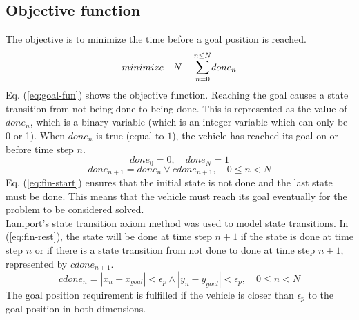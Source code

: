 \subsection{Objective function}
The objective is to minimize the time before a goal position is reached.
\begin{equation}
\label{eq:goal-fun}
minimize \quad N - \mathlarger{\sum}_{n=0}^{n \leq N} done_n
\end{equation}
Eq. (\ref{eq:goal-fun}) shows the objective function. Reaching the goal causes a state transition from not being done to being done. This is represented as the value of $done_n$, which is a binary variable (which is an integer variable which can only be 0 or 1). When $done_n$ is true (equal to $1$), the vehicle has reached its goal on or before time step $n$.
\begin{equation}
\label{eq:fin-start}
done_0 = 0, \quad done_{N} = 1
\end{equation}
\begin{equation}
\label{eq:fin-rest}
done_{n+1} = done_n \vee cdone_{n+1},  \quad 0 \leq n < N
\end{equation}
Eq. (\ref{eq:fin-start}) ensures that the initial state is not done and the last state must be done. This means that the vehicle must reach its goal eventually for the problem to be considered solved. \\
Lamport's \cite{Lamport1989} state transition axiom method was used to model state transitions. In (\ref{eq:fin-rest}), the state will be done at time step $n+1$ if the state is done at time step $n$ or if there is a state transition from not done to done at time step $n + 1$, represented by $cdone_{n+1}$.
\begin{equation}
\label{eq:cfin-p}
cdone_n = |x_{n} - x_{goal}| < \epsilon_{p} \wedge  |y_{n} - y_{goal}| < \epsilon_{p},  \quad 0 \leq n < N
\end{equation}
The goal position requirement is fulfilled if the vehicle is closer than $\epsilon_p$ to the goal position in both dimensions.
